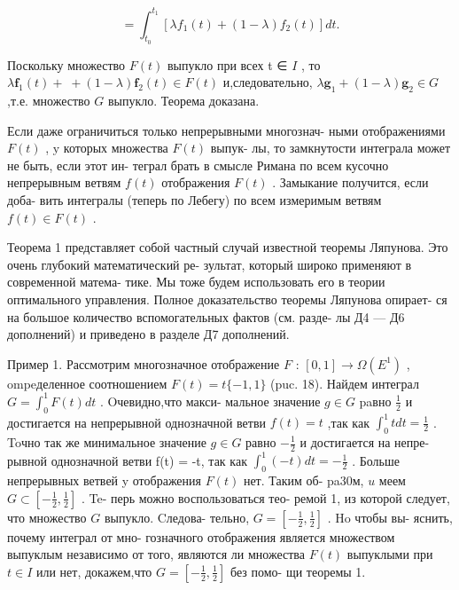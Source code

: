 \documentclass[8pt]{extarticle}
\begin{document}
\[
= {\int }_{{t}_{0}}^{{t}_{1}}\left\lbrack  {\lambda {f}_{1}\left( t\right)  + \left( {1 - \lambda }\right) {f}_{2}\left( t\right) }\right\rbrack  {dt}.
\]

Поскольку множество \(F\left( t\right)\) выпукло при всех t ∈ \(I\) , то \(\lambda {\mathbf{f}}_{1}\left( t\right)  + \; + \left( {1 - \lambda }\right) {\mathbf{f}}_{2}\left( t\right)  \in  F\left( t\right)\) и,следовательно, \(\lambda {\mathbf{g}}_{1} + \left( {1 - \lambda }\right) {\mathbf{g}}_{2} \in  G\) ,т.е. множество \(G\) выпукло. Теорема доказана.

Если даже ограничиться только непрерывными многознач- ными отображениями \(F\left( t\right)\) , \(\mathrm{y}\) которых множества \(F\left( t\right)\) выпук- лы, то замкнутости интеграла может не быть, если этот ин- теграл брать в смысле Римана по всем кусочно непрерывным ветвям \(f\left( t\right)\) отображения \(F\left( t\right)\) . Замыкание получится, если доба- вить интегралы (теперь по Лебегу) по всем измеримым ветвям \(f\left( t\right)  \in  F\left( t\right)\) .

Теорема 1 представляет собой частный случай известной теоремы Ляпунова. Это очень глубокий математический ре- зультат, который широко применяют в современной матема- тике. Мы тоже будем использовать его в теории оптимального управления. Полное доказательство теоремы Ляпунова опирает- ся на большое количество вспомогательных фактов (см. разде- лы Д4 — Д6 дополнений) и приведено в разделе Д7 дополнений.

Пример 1. Рассмотрим многозначное отображение \(F\) : \(\left\lbrack  {0,1}\right\rbrack   \rightarrow  \Omega \left( {E}^{1}\right)\) , ompeделенное соотношением \(F\left( t\right)  = t\{  - 1,1\}\) (puc. 18). Найдем интеграл \(G = {\int }_{0}^{1}F\left( t\right) {dt}\) . Oчевидно,что макси- мальное значение \(g \in  G\) paвно \(\frac{1}{2}\) и достигается на непрерывной однозначной ветви \(f\left( t\right)  = t\) ,так как \({\int }_{0}^{1}{tdt} = \frac{1}{2}\) . Toчно так же минимальное значение \(g \in  G\) равно \(- \frac{1}{2}\) и достигается на непре- рывной однозначной ветви f(t) = -t, так как \({\int }_{0}^{1}\left( {-t}\right) {dt} =  - \frac{1}{2}\) . Больше непрерывных ветвей y отображения \(F\left( t\right)\) нет. Таким об- pa30м, \(u\) меем \(G \subset  \left\lbrack  {-\frac{1}{2},\frac{1}{2}}\right\rbrack\) . Te- перь можно воспользоваться тео- ремой 1, из которой следует, что множество \(G\) выпукло. Cледова- тельно, \(G = \left\lbrack  {-\frac{1}{2},\frac{1}{2}}\right\rbrack\) . Ho чтобы вы- яснить, почему интеграл от мно- гозначного отображения является множеством выпуклым независимо от того, являются ли множества \(F\left( t\right)\) выпуклыми при \(t \in  I\) или нет, докажем,что \(G = \left\lbrack  {-\frac{1}{2},\frac{1}{2}}\right\rbrack\) без помо- щи теоремы 1.
\end{document}
